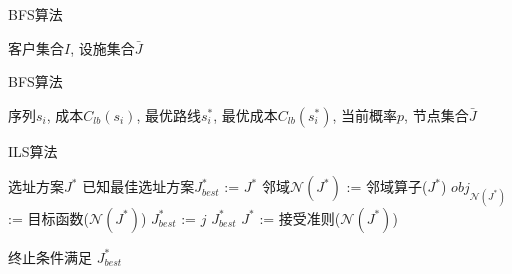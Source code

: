 \documentclass[11pt]{article}
\begin{document}
\begin{CJK*}{UTF8}{gkai}


\begin{algorithm}
\caption{BFS算法}
\begin{algorithmic}[1] %
        \Require 客户集合$I$, 设施集合$\bar{J}$
    \end{algorithmic}
\end{algorithm}


\begin{algorithm}
\caption{BFS算法}
    \begin{algorithmic}[1] %
        \Require 序列$s_i$, 成本$C_{lb}(s_i)$, 最优路线$s_i^*$, 最优成本$C_{lb}(s_i^*)$, 当前概率$p$, 节点集合$\bar{J}$

    \end{algorithmic}
\end{algorithm}


\begin{algorithm}
\caption{ILS算法}
    \begin{algorithmic}[1] %
        \Require 选址方案$J^*$
        \State 已知最佳选址方案$J^*_{best}$ := $J^*$
        \Repeat 
            \State 邻域$\mathcal{N}(J^*)$ := 邻域算子($J^*$)
            \State $obj_{\mathcal{N}(J^*)}$ := 目标函数($\mathcal{N}(J^*)$)
                \State $J^*_{best}$ := $j$
                \State \Return $J^*_{best}$
            \Else 
                \State $J^*$ := 接受准则($\mathcal{N}(J^*)$)
            \EndIf

        \Until 终止条件满足
        \State \Return $J^*_{best}$
    \end{algorithmic}
\end{algorithm}


\end{CJK*}
\end{document}
